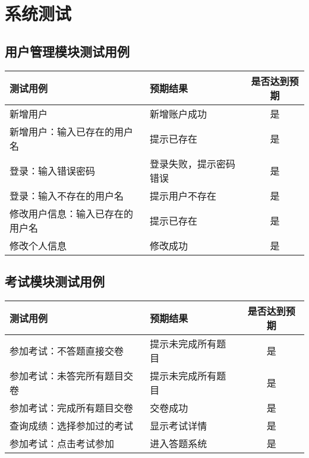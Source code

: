 \section{系统测试}
\subsection{用户管理模块测试用例}
\begin{table}[h!]
\begin{tabularx}{\linewidth}{@{}Xlc@{}}
\toprule
测试用例        & 预期结果        & 是否达到预期 \\ \midrule
新增用户        & 新增账户成功      & 是      \\
新增用户：输入已存在的用户名 & 提示已存在       & 是      \\
登录：输入错误密码    & 登录失败，提示密码错误 & 是      \\
登录：输入不存在的用户名 & 提示用户不存在     & 是      \\
修改用户信息：输入已存在的用户名 & 提示已存在 & 是 \\
修改个人信息      & 修改成功        & 是      \\ \bottomrule
\end{tabularx}
\end{table}


\subsection{考试模块测试用例}
\begin{table}[h!]
\begin{tabularx}{\linewidth}{@{}Xlc@{}}
\toprule
测试用例           & 预期结果      & 是否达到预期 \\ \midrule
参加考试：不答题直接交卷   & 提示未完成所有题目 & 是      \\
参加考试：未答完所有题目交卷 & 提示未完成所有题目 & 是      \\
参加考试：完成所有题目交卷  & 交卷成功      & 是      \\
查询成绩：选择参加过的考试  & 显示考试详情    & 是      \\
参加考试：点击考试参加    & 进入答题系统    & 是   \\ \bottomrule
\end{tabularx}
\end{table}

